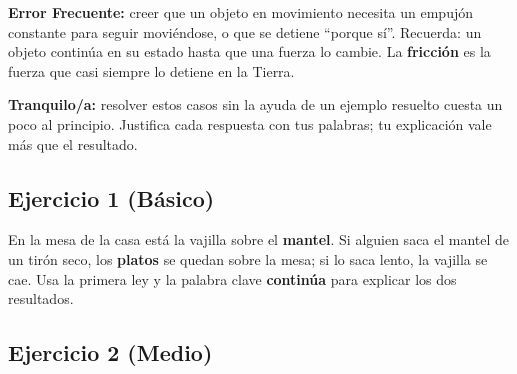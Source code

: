 \documentclass[
  spanish,
  letterpaper,
  12pt,
  oneside,
  open=any,
  DIV=15]{scrbook}
\begin{document}
\begin{tcolorbox}[enhanced jigsaw, arc=.35mm, bottomrule=.15mm, bottomtitle=1mm, breakable, colback=white, colbacktitle=quarto-callout-caution-color!10!white, colframe=quarto-callout-caution-color-frame, coltitle=black, left=2mm, leftrule=.75mm, opacityback=0, opacitybacktitle=0.6, rightrule=.15mm, title=\textcolor{quarto-callout-caution-color}{\faFire}\hspace{0.5em}{Prevención de Errores (Cuidado)}, titlerule=0mm, toprule=.15mm, toptitle=1mm]

\textbf{Error Frecuente:} creer que un objeto en movimiento necesita un
empujón constante para seguir moviéndose, o que se detiene ``porque
sí''. Recuerda: un objeto continúa en su estado hasta que una fuerza lo
cambie. La \textcolor[HTML]{2563EB}{\textbf{fricción}} es la fuerza que
casi siempre lo detiene en la Tierra.

\end{tcolorbox}

\begin{tcolorbox}[enhanced jigsaw, arc=.35mm, bottomrule=.15mm, bottomtitle=1mm, breakable, colback=white, colbacktitle=quarto-callout-note-color!10!white, colframe=quarto-callout-note-color-frame, coltitle=black, left=2mm, leftrule=.75mm, opacityback=0, opacitybacktitle=0.6, rightrule=.15mm, title=\textcolor{quarto-callout-note-color}{\faInfo}\hspace{0.5em}{Apoyo Socioemocional}, titlerule=0mm, toprule=.15mm, toptitle=1mm]

\textbf{Tranquilo/a:} resolver estos casos sin la ayuda de un ejemplo
resuelto cuesta un poco al principio. Justifica cada respuesta con tus
palabras; tu explicación vale más que el resultado.

\end{tcolorbox}

\subsection{Ejercicio 1 (Básico)}\label{ejercicio-1-buxe1sico-1}

En la mesa de la casa está la vajilla sobre el
\textcolor[HTML]{2563EB}{\textbf{mantel}}. Si alguien saca el mantel de
un tirón seco, los \textcolor[HTML]{7C3AED}{\textbf{platos}} se quedan
sobre la mesa; si lo saca lento, la vajilla se cae. Usa la primera ley y
la palabra clave \textbf{continúa} para explicar los dos resultados.

\subsection{Ejercicio 2 (Medio)}\label{ejercicio-2-medio-1}
\end{document}

